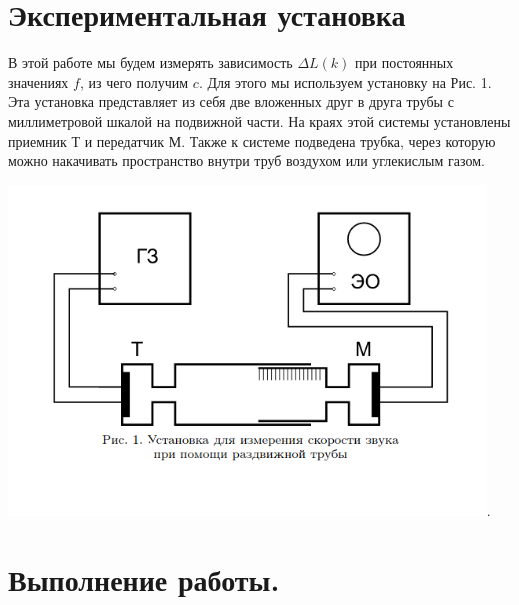 \documentclass[12pt,a4paper]{article}
\begin{document}
\section{Экспериментальная установка}
В этой работе мы будем измерять зависимость $\Delta L(k)$ при постоянных значениях $f$, из чего получим $c$. Для этого мы используем установку на Рис. 1. Эта установка представляет из себя две вложенных друг в друга трубы с миллиметровой шкалой на подвижной части. На краях этой системы установлены приемник Т и передатчик М. Также к системе подведена трубка, через которую можно накачивать пространство внутри труб воздухом или углекислым газом.
\begin{center}
\includegraphics[width=0.95\textwidth]{equip.png}.
\end{center}


\section{Выполнение работы.}
\end{document}
